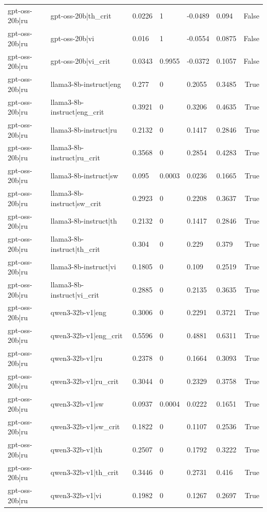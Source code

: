 \begin{table}
\begin{tabular}{llllllr}
gpt-oss-20b|ru & gpt-oss-20b|th_crit & 0.0226 & 1 & -0.0489 & 0.094 & False \\
gpt-oss-20b|ru & gpt-oss-20b|vi & 0.016 & 1 & -0.0554 & 0.0875 & False \\
gpt-oss-20b|ru & gpt-oss-20b|vi_crit & 0.0343 & 0.9955 & -0.0372 & 0.1057 & False \\
gpt-oss-20b|ru & llama3-8b-instruct|eng & 0.277 & 0 & 0.2055 & 0.3485 & True \\
gpt-oss-20b|ru & llama3-8b-instruct|eng_crit & 0.3921 & 0 & 0.3206 & 0.4635 & True \\
gpt-oss-20b|ru & llama3-8b-instruct|ru & 0.2132 & 0 & 0.1417 & 0.2846 & True \\
gpt-oss-20b|ru & llama3-8b-instruct|ru_crit & 0.3568 & 0 & 0.2854 & 0.4283 & True \\
gpt-oss-20b|ru & llama3-8b-instruct|sw & 0.095 & 0.0003 & 0.0236 & 0.1665 & True \\
gpt-oss-20b|ru & llama3-8b-instruct|sw_crit & 0.2923 & 0 & 0.2208 & 0.3637 & True \\
gpt-oss-20b|ru & llama3-8b-instruct|th & 0.2132 & 0 & 0.1417 & 0.2846 & True \\
gpt-oss-20b|ru & llama3-8b-instruct|th_crit & 0.304 & 0 & 0.229 & 0.379 & True \\
gpt-oss-20b|ru & llama3-8b-instruct|vi & 0.1805 & 0 & 0.109 & 0.2519 & True \\
gpt-oss-20b|ru & llama3-8b-instruct|vi_crit & 0.2885 & 0 & 0.2135 & 0.3635 & True \\
gpt-oss-20b|ru & qwen3-32b-v1|eng & 0.3006 & 0 & 0.2291 & 0.3721 & True \\
gpt-oss-20b|ru & qwen3-32b-v1|eng_crit & 0.5596 & 0 & 0.4881 & 0.6311 & True \\
gpt-oss-20b|ru & qwen3-32b-v1|ru & 0.2378 & 0 & 0.1664 & 0.3093 & True \\
gpt-oss-20b|ru & qwen3-32b-v1|ru_crit & 0.3044 & 0 & 0.2329 & 0.3758 & True \\
gpt-oss-20b|ru & qwen3-32b-v1|sw & 0.0937 & 0.0004 & 0.0222 & 0.1651 & True \\
gpt-oss-20b|ru & qwen3-32b-v1|sw_crit & 0.1822 & 0 & 0.1107 & 0.2536 & True \\
gpt-oss-20b|ru & qwen3-32b-v1|th & 0.2507 & 0 & 0.1792 & 0.3222 & True \\
gpt-oss-20b|ru & qwen3-32b-v1|th_crit & 0.3446 & 0 & 0.2731 & 0.416 & True \\
gpt-oss-20b|ru & qwen3-32b-v1|vi & 0.1982 & 0 & 0.1267 & 0.2697 & True \\

\end{tabular}
\end{table}
